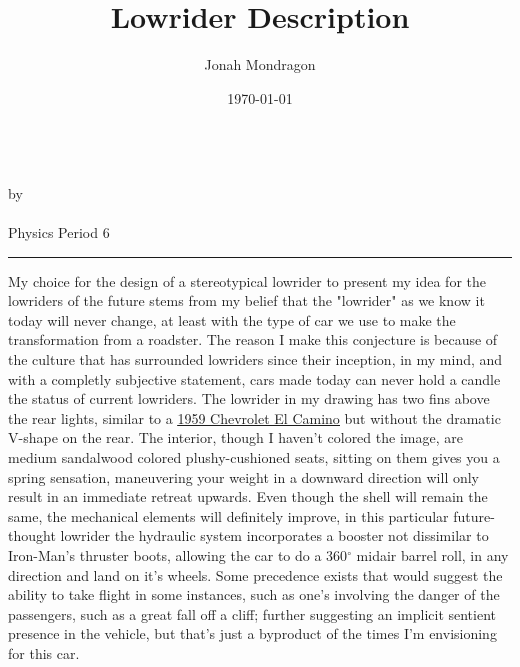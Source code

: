 \documentclass[12pt]{article}
\newcommand{\PutTitle}[1]
{
    \begin{center}
        {\huge\bfseries\thetitle}\\
        by \theauthor\\
        \thedate\\
        #1        
    \end{center}
    \hrule
    \vspace{2ex}
}
\begin{document}
\doublespacing
\thispagestyle{empty}

\title{Lowrider Description}
\author{Jonah Mondragon}
\date{\today}

\PutTitle{Physics Period 6}

My choice for the design of a stereotypical lowrider to present my idea for the lowriders of the future
    stems from my belief that the "lowrider" as we know it today will never change, at least with the
    type of car we use to make the transformation from a roadster. 
    The reason I make this conjecture is because of the culture that has surrounded lowriders since 
    their inception, in my mind, and with a completly subjective statement, cars made today can never 
    hold a candle the status of current lowriders.
    The lowrider in my drawing has two fins above the rear lights, similar to a
    {\color{blue}\underline{\href{http://cascadiaclassics.com/home/2018/1/20/1959-chevrolet-el-camino}{1959 Chevrolet El Camino}}}
    but without the dramatic V-shape on the rear.
The interior, though I haven't colored the image, are medium sandalwood colored plushy-cushioned seats,
    sitting on them gives you a spring sensation, maneuvering your weight in a downward direction will
    only result in an immediate retreat upwards.
Even though the shell will remain the same, the mechanical elements will definitely improve, in this
    particular future-thought lowrider the hydraulic system incorporates a booster not dissimilar to
    Iron-Man's thruster boots, allowing the car to do a 360$^{\circ}$ midair barrel roll, in any 
    direction and land on it's wheels.
Some precedence exists that would suggest the ability to take flight in some instances, such as one's
    involving the danger of the passengers, such as a great fall off a cliff; further suggesting an
    implicit sentient presence in the vehicle, but that's just a byproduct of the times I'm envisioning
    for this car.
\end{document}
